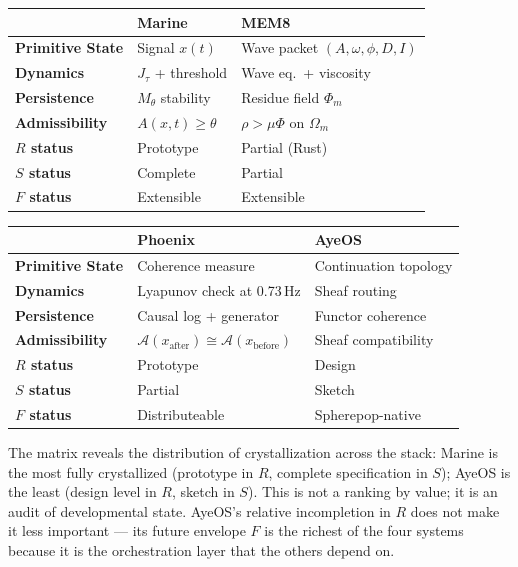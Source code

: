 \documentclass[12pt, oneside]{book}
\theoremstyle{flyxion}
\theoremstyle{definition}
\begin{document}
\begin{center}
\renewcommand{\arraystretch}{1.5}
\small
\begin{tabular}{>{\bfseries}lll}
\toprule
 & Marine & MEM\textbar{}8 \\
\midrule
Primitive State &
  Signal $x(t)$ &
  Wave packet $(A,\omega,\phi,D,I)$ \\
Dynamics &
  $J_\tau$ + threshold &
  Wave eq.\ + viscosity \\
Persistence &
  $M_\theta$ stability &
  Residue field $\Phi_m$ \\
Admissibility &
  $A(x,t) \geq \theta$ &
  $\rho > \mu\Phi$ on $\Omega_m$ \\
$R$ status & Prototype & Partial (Rust) \\
$S$ status & Complete & Partial \\
$F$ status & Extensible & Extensible \\
\bottomrule
\end{tabular}

\medskip

\begin{tabular}{>{\bfseries}lll}
\toprule
 & Phoenix & AyeOS \\
\midrule
Primitive State &
  Coherence measure &
  Continuation topology \\
Dynamics &
  Lyapunov check at 0.73\,Hz &
  Sheaf routing \\
Persistence &
  Causal log + generator &
  Functor coherence \\
Admissibility &
  $\mathcal{A}(x_\mathrm{after}) \cong
  \mathcal{A}(x_\mathrm{before})$ &
  Sheaf compatibility \\
$R$ status & Prototype & Design \\
$S$ status & Partial & Sketch \\
$F$ status & Distributeable & Spherepop-native \\
\bottomrule
\end{tabular}
\end{center}

The matrix reveals the distribution of crystallization
across the stack: Marine is the most fully crystallized
(prototype in $R$, complete specification in $S$);
AyeOS is the least (design level in $R$, sketch in
$S$). This is not a ranking by value; it is an audit
of developmental state. AyeOS's relative incompletion
in $R$ does not make it less important --- its future
envelope $F$ is the richest of the four systems because
it is the orchestration layer that the others depend on.
\end{document}
